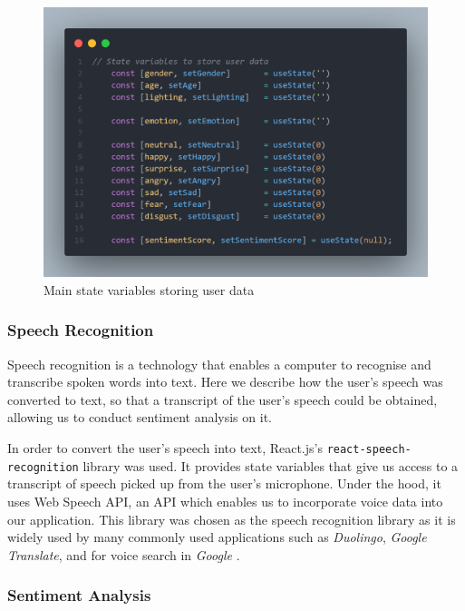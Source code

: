 \documentclass[12pt, a4paper]{article}
\newcommand{\np}
    {
    \vskip 0.4cm
    }
\begin{document}
\begin{figure}[H]
    \centering
    \includegraphics[scale=0.29]{images/codestatevars.png}
    \caption{Main state variables storing user data}
    \label{fig:codestatevars}
\end{figure}

\subsubsection{Speech Recognition}
\label{srecog}
Speech recognition is a technology that enables a computer to recognise and transcribe spoken words into text. Here we describe how the user's speech was converted to text, so that a transcript of the user's speech could be obtained, allowing us to conduct sentiment analysis on it.
\np
In order to convert the user's speech into text, React.js's \verb+react-speech-recognition+ library was used. It provides state variables that give us access to a transcript of speech picked up from the user's microphone. Under the hood, it uses Web Speech API, an API which enables us to incorporate voice data into our application. This library was chosen as the speech recognition library as it is widely used by many commonly used applications such as \textit{Duolingo}, \textit{Google Translate}, and for voice search in \textit{Google} \citep{webspeechapi}. 

\subsubsection{Sentiment Analysis}
\label{sentanal}
\end{document}
